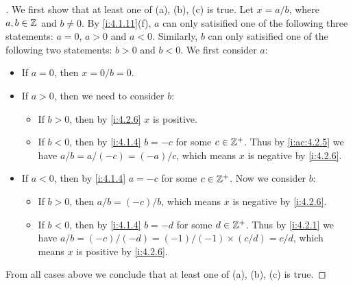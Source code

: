 \begin{proof}[]
  We first show that at least one of (a), (b), (c) is true.
  Let \(x = a / b\), where \(a, b \in \mathbb{Z}\) and \(b \neq 0\).
  By \cref{i:4.1.11}(f), \(a\) can only satisified one of the following three statements:
  \(a = 0\), \(a > 0\) and \(a < 0\).
  Similarly, \(b\) can only satisified one of the following two statements:
  \(b > 0\) and \(b < 0\).
  We first consider \(a\):
  \begin{itemize}
    \item If \(a = 0\), then \(x = 0 / b = 0\).
    \item If \(a > 0\), then we need to consider \(b\):
          \begin{itemize}
            \item If \(b > 0\), then by \cref{i:4.2.6} \(x\) is positive.
            \item If \(b < 0\), then by \cref{i:4.1.4} \(b = -c\) for some \(c \in \mathbb{Z}^+\).
                  Thus by \cref{i:ac:4.2.5} we have \(a / b = a / (-c) = (-a) / c\), which means \(x\) is negative by \cref{i:4.2.6}.
          \end{itemize}
    \item If \(a < 0\), then by \cref{i:4.1.4} \(a = -c\) for some \(c \in \mathbb{Z}^+\).
          Now we consider \(b\):
          \begin{itemize}
            \item If \(b > 0\), then \(a / b = (-c) / b\), which means \(x\) is negative by \cref{i:4.2.6}.
            \item If \(b < 0\), then by \cref{i:4.1.4} \(b = -d\) for some \(d \in \mathbb{Z}^+\).
                  Thus by \cref{i:4.2.1} we have \(a / b = (-c) / (-d) = (-1) / (-1) \times (c / d) = c / d\), which means \(x\) is positive by \cref{i:4.2.6}.
          \end{itemize}
  \end{itemize}
  From all cases above we conclude that at least one of (a), (b), (c) is true.


\end{proof}
